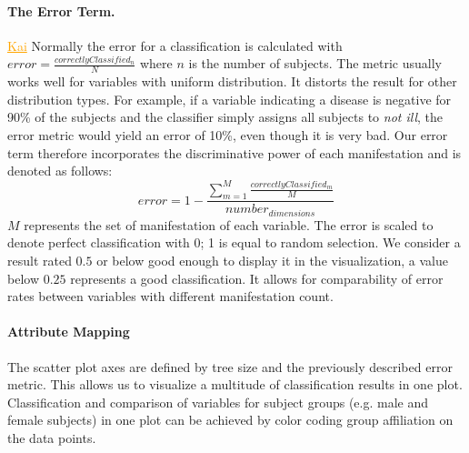 \documentclass[a4paper,twoside]{style/article}
\newcommand{\com}[1]{\textcolor{orange}{\uline{#1}}}
\begin{document}
\paragraph{The Error Term. }
\com{Kai}
Normally the error for a classification is calculated with $error = \frac{correctlyClassified_{n}} {N}$ where $n$ is the number of subjects.
The metric usually works well for variables with uniform distribution.
It distorts the result for other distribution types.
For example, if a variable indicating a disease is negative for 90\% of the subjects and the classifier simply assigns all subjects to \emph{not ill}, the error metric would yield an error of 10\%, even though it is very bad.
Our error term therefore incorporates the discriminative power of each manifestation and is denoted as follows:
\begin{equation}
error = 1 - \frac{\sum_{m=1}^M \frac{correctlyClassified_{m}}{M}}{number_{dimensions}}
\end{equation}
$M$ represents the set of manifestation of each variable.
The error is scaled to denote perfect classification with 0; 1 is equal to random selection.
We consider a result rated $0.5$ or below good enough to display it in the visualization, a value below $0.25$ represents a good classification.
It allows for comparability of error rates between variables with different manifestation count.

\paragraph{Attribute Mapping}
The scatter plot axes are defined by tree size and the previously described error metric.
This allows us to visualize a multitude of classification results in one plot.
Classification and comparison of variables for subject groups (e.g. male and female subjects) in one plot can be achieved by color coding group affiliation on the data points.
\end{document}
